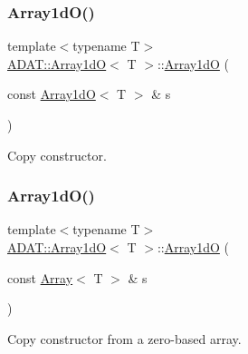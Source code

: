 \subsubsection{\texorpdfstring{Array1dO()}{Array1dO()}\hspace{0.1cm}{\footnotesize\ttfamily [8/15]}}
{\footnotesize\ttfamily template$<$typename T$>$ \\
\mbox{\hyperlink{classADAT_1_1Array1dO}{A\+D\+A\+T\+::\+Array1dO}}$<$ T $>$\+::\mbox{\hyperlink{classADAT_1_1Array1dO}{Array1dO}} (\begin{DoxyParamCaption}\item[{const \mbox{\hyperlink{classADAT_1_1Array1dO}{Array1dO}}$<$ T $>$ \&}]{s }\end{DoxyParamCaption})\hspace{0.3cm}{\ttfamily [inline]}}



Copy constructor. 

\mbox{\label{classADAT_1_1Array1dO_adcc074ae1935a9371a950d1a99bfa3ec}} 
\subsubsection{\texorpdfstring{Array1dO()}{Array1dO()}\hspace{0.1cm}{\footnotesize\ttfamily [9/15]}}
{\footnotesize\ttfamily template$<$typename T$>$ \\
\mbox{\hyperlink{classADAT_1_1Array1dO}{A\+D\+A\+T\+::\+Array1dO}}$<$ T $>$\+::\mbox{\hyperlink{classADAT_1_1Array1dO}{Array1dO}} (\begin{DoxyParamCaption}\item[{const \mbox{\hyperlink{classXMLArray_1_1Array}{Array}}$<$ T $>$ \&}]{s }\end{DoxyParamCaption})\hspace{0.3cm}{\ttfamily [inline]}}



Copy constructor from a zero-\/based array. 

\mbox{\label{classADAT_1_1Array1dO_aad6c2df87d1dc941fd561fd74d181ddc}} 
